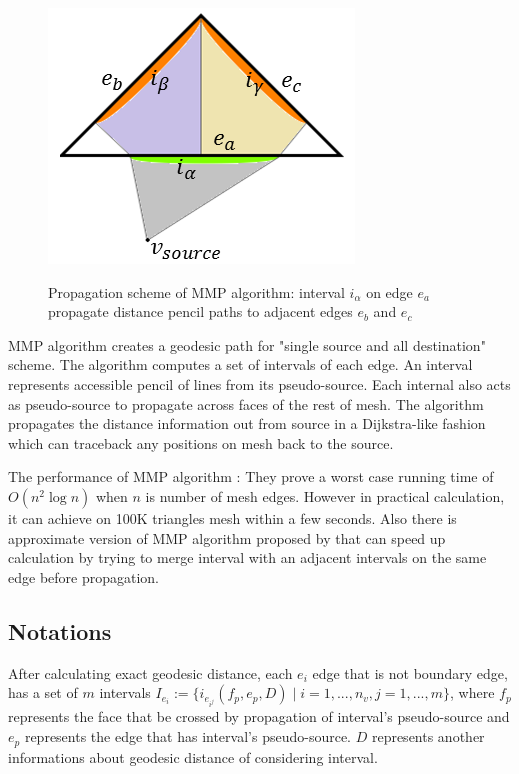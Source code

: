 \documentclass[a4paper,twoside]{article}
\begin{document}
\begin{figure}[!h]
	\centering
	{\includegraphics[width=0.75\columnwidth]{images/mmp_algorithm.png}}
	\caption{Propagation scheme of MMP algorithm: interval $i_{\alpha}$ on edge $e_a$ propagate distance pencil paths to adjacent edges $e_b$ and $e_c$ }
	\label{fig:mmp algorithm}
\end{figure}

MMP algorithm creates a geodesic path for "single source and all destination" scheme. The algorithm computes a set of intervals of each edge. An interval represents accessible pencil of lines from its pseudo-source. Each internal also acts as pseudo-source to propagate across faces of the rest of mesh. The algorithm propagates the distance information out from source in a Dijkstra-like fashion which can traceback any positions on mesh back to the source.

The performance of MMP algorithm : They prove a worst case
running time of $O(n^2 \log n)$ when $n$ is number of mesh edges. However in practical calculation, it can achieve on 100K triangles mesh within a few seconds. Also there is approximate version of MMP algorithm proposed by \cite{Surazhsky:2005:FEA:1073204.1073228} that can speed up calculation by trying to merge interval with an adjacent intervals on the same edge before propagation.

\subsection*{Notations}
After calculating exact geodesic distance, each $e_i$ edge that is not boundary edge, has a set of $m$ intervals $I_{e_i}:=\{ i_{e_{i^j}}(f_p,e_p,D) \mid i = 1, ... ,n_v , j = 1,...,m\}$, where $f_p$ represents the face that be crossed by propagation of interval's pseudo-source and $e_p$ represents the edge that has interval's pseudo-source. $D$ represents another informations about geodesic distance of considering interval.
\end{document}
